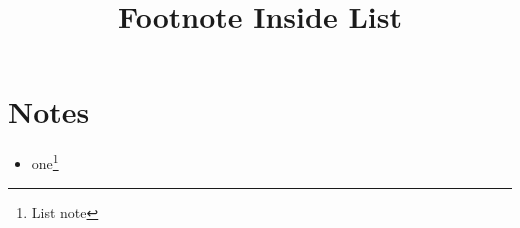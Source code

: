 \documentclass{article}
\begin{document}
\title{Footnote Inside List}\maketitle
\section{Notes}\begin{itemize}\item one\footnote{List note}\end{itemize}
\end{document}
